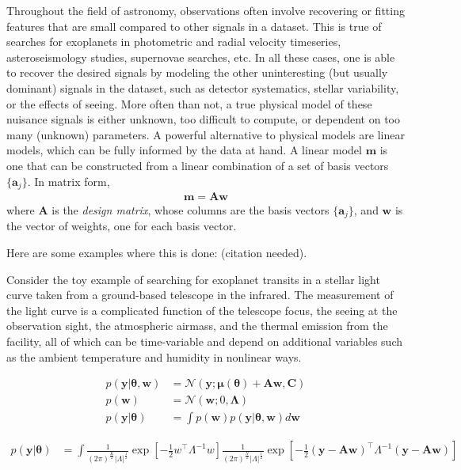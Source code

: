 \documentclass[modern]{aastex61}
\newcommand{\bvec}[1]{{\ensuremath{\boldsymbol{#1}}}}
\newcommand{\citeme}{{\color{red}(citation needed)}}
\newcommand{\Gaussian}[3]{\ensuremath{\frac{1}{(2\pi)^\frac{#3}{2}|#2|^\frac{1}{2}} \exp\left[ -\frac{1}{2}#1^\top #2^{-1} #1 \right]}}
\begin{document}
Throughout the field of astronomy, observations often involve recovering or fitting features that are small compared to other signals in a dataset. This is true of searches for exoplanets in photometric and radial velocity timeseries, asteroseismology studies, supernovae searches, etc. In all these cases, one is able to recover the desired signals by modeling the other uninteresting (but usually dominant) signals in the dataset, such as detector systematics, stellar variability, or the effects of seeing. More often than not, a true physical model of these nuisance signals is either unknown, too difficult to compute, or dependent on too many (unknown) parameters. A powerful alternative to physical models are linear models, which can be fully informed by the data at hand. A linear model $\bvec{m}$ is one that can be constructed from a linear combination of a set of basis vectors $\{\bvec{a}_j\}$. In matrix form,
%
\begin{align}
\bvec{m} = \bvec{A} \bvec{w}
\end{align}
%
where $\bvec{A}$ is the \emph{design matrix}, whose columns are the basis vectors $\{\bvec{a}_j\}$, and $\bvec{w}$ is the vector of weights, one for each basis vector.

Here are some examples where this is done: \citeme.

Consider the toy example of searching for exoplanet transits in a stellar light curve taken from a ground-based telescope in the infrared. The measurement of the light curve is a complicated function of the telescope focus, the seeing at the observation sight, the atmospheric airmass, and the thermal emission from the facility, all of which can be time-variable and depend on additional variables such as the ambient temperature and humidity in nonlinear ways.

\begin{align}
p(\bvec{y} | \bvec{\theta}, \bvec{w}) &= \mathcal{N}(\bvec{y}; \bvec{\mu}(\bvec{\theta}) + \bvec{A}\bvec{w}, \bvec{C}) \nonumber\\
%
p(\bvec{w}) &= \mathcal{N}(\bvec{w}; 0, \bvec{\Lambda}) \nonumber\\
%
p(\bvec{y} | \bvec{\theta}) &= \int p(\bvec{w}) p(\bvec{y} | \bvec{\theta}, \bvec{w}) d\bvec{w}
\end{align}

\begin{align}
p(\bvec{y} | \bvec{\theta}) &=  \int \Gaussian{w}{\Lambda}{K} 
                                     \Gaussian{(\bvec{y} - 
                                                \bvec{A}\bvec{w})}{\Lambda}{N}
    
\end{align}

\citep{Luger:2017,Luger:2016}


\end{document}
